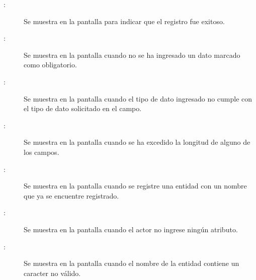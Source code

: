 	
\begin{description}
	\item[:] Se muestra en la pantalla  para indicar que el registro fue exitoso.
	\item[:] Se muestra en la pantalla  cuando no se ha ingresado un dato marcado como obligatorio.
	\item[:] Se muestra en la pantalla  cuando el tipo de dato ingresado no cumple con el tipo de dato solicitado en el campo.
	\item[:] Se muestra en la pantalla  cuando se ha excedido la longitud de alguno de los campos.
	\item[:] Se muestra en la pantalla  cuando se registre una entidad con un nombre que ya se encuentre registrado.
	\item[:] Se muestra en la pantalla  cuando el actor no ingrese ningún atributo.
	\item[:] Se muestra en la pantalla  cuando el nombre de la entidad contiene un caracter no válido.
\end{description}
